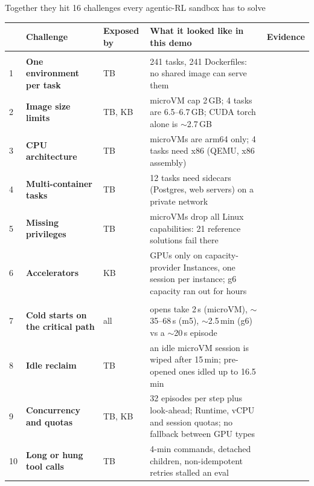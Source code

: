 \begin{frame}{Together they hit 16 challenges every agentic-RL sandbox has to solve}
\tiny\setlength{\tabcolsep}{3pt}
\begin{tabularx}{\textwidth}{@{}P{0.02\textwidth} P{0.23\textwidth} P{0.07\textwidth} Y P{0.06\textwidth}@{}}
\toprule
& \textbf{Challenge} & \textbf{Exposed by} & \textbf{What it looked like in this demo} & \textbf{Evidence}\\
\midrule
{}\\
1 & \textbf{One environment per task} & TB & 241 tasks, 241 Dockerfiles: no shared image can serve them & \\
2 & \textbf{Image size limits} & TB, KB & microVM cap 2\,GB; 4 tasks are 6.5--6.7\,GB; CUDA torch alone is $\sim$2.7\,GB & \\
3 & \textbf{CPU architecture} & TB & microVMs are arm64 only; 4 tasks need x86 (QEMU, x86 assembly) & \\
4 & \textbf{Multi-container tasks} & TB & 12 tasks need sidecars (Postgres, web servers) on a private network & \\
5 & \textbf{Missing privileges} & TB & microVMs drop all Linux capabilities: 21 reference solutions fail there & \\
6 & \textbf{Accelerators} & KB & GPUs only on capacity-provider Instances, one session per instance; g6 capacity ran out for hours & \\
\\
7 & \textbf{Cold starts on the critical path} & all & opens take 2\,s (microVM), $\sim$35--68\,s (m5), $\sim$2.5\,min (g6) vs a $\sim$20\,s episode & \\
8 & \textbf{Idle reclaim} & TB & an idle microVM session is wiped after 15\,min; pre-opened ones idled up to 16.5\,min & \\
9 & \textbf{Concurrency and quotas} & TB, KB & 32 episodes per step plus look-ahead; Runtime, vCPU and session quotas; no fallback between GPU types & \\
10 & \textbf{Long or hung tool calls} & TB & 4-min commands, detached children, non-idempotent retries stalled an eval & \\

\end{tabularx}
\end{frame}
